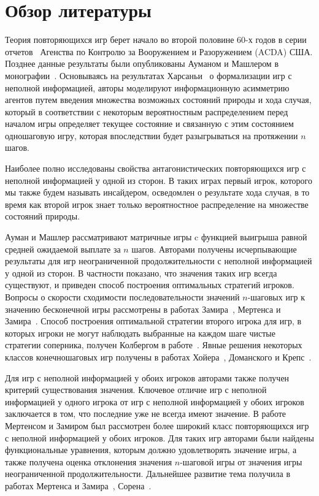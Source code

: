 \chapter*{Обзор литературы}

Теория повторяющихся игр берет начало во второй половине 60-х годов в серии отчетов~\cite{r:aumann66, r:aumann67, r:aumann68a, r:aumann68b, r:stearns67} Агенства по Контролю за Вооружением и Разоружением (ACDA) США.
Позднее данные результаты были опубликованы Ауманом и Машлером в монографии~\cite{aumann95}.
Основываясь на результатах Харсаньи~\cite{harsanyi67} о формализации игр с неполной информацией, авторы моделируют информационную асимметрию агентов путем введения множества возможных состояний природы и хода случая, который в соответствии с некоторым вероятностным распределением перед началом игры определяет текущее состояние и связанную с этим состоянием одношаговую игру, которая впоследствии будет разыгрываться на протяжении $n$ шагов.

Наиболее полно исследованы свойства антагонистических повторяющихся игр с неполной информацией у одной из сторон.
В таких играх первый игрок, которого мы также будем называть инсайдером, осведомлен о результате хода случая, в то время как второй игрок знает только вероятностное распределение на множестве состояний природы.

Ауман и Машлер рассматривают матричные игры c функцией выигрыша равной средней ожидаемой выплате за $n$ шагов.
Авторами получены исчерпывающие результаты для игр неограниченной продолжительности с неполной информацией у одной из сторон.
В частности показано, что значения таких игр всегда существуют, и приведен способ построения оптимальных стратегий игроков.
%
Вопросы о скорости сходимости последовательности значений $n$-шаговых игр к значению бесконечной игры рассмотрены в работах Замира~\cite{zamir71}, Мертенса и Замира~\cite{mertens76,mertens77}.
%
Способ построения оптимальной стратегии второго игрока для игр, в которых игроки не могут наблюдать выбранные на каждом шаге чистые стратегии соперника, получен Колбергом в работе~\cite{kohlberg75}.
%
Явные решения некоторых классов конечношаговых игр получены в работах Хойера~\cite{heuer91}, Доманского и Крепс~\cite{domansky94,domansky95,domansky99}.

Для игр с неполной информацией у обоих игроков авторами также получен критерий существования значения.
Ключевое отличие игр с неполной информацией у одного игрока от игр с неполной информацией у обоих игроков заключается в том, что последние уже не всегда имеют значение.
В работе~\cite{mertens71} Мертенсом и Замиром был рассмотрен более широкий класс повторяющихся игр с неполной информацией у обоих игроков.
Для таких игр авторами были найдены функциональные уравнения, которым должно удовлетворять значение игры, а также получена оценка отклонения значения $n$-шаговой игры от значения игры неограниченной продолжительности.
Дальнейшее развитие тема получила в работах Мертенса и Замира~\cite{mertens77}, Сорена~\cite{sorin84}.

